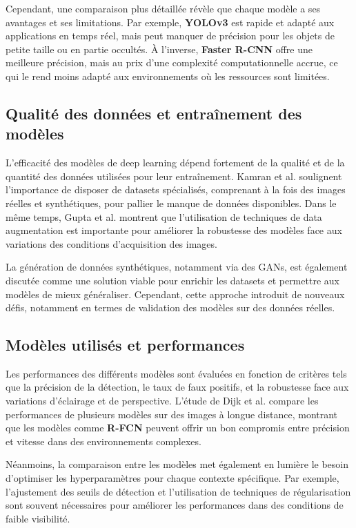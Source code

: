 Cependant, une comparaison plus détaillée révèle que chaque modèle a ses avantages et ses limitations. Par exemple, \textbf{YOLOv3} est rapide et adapté aux applications en temps réel, mais peut manquer de précision pour les objets de petite taille ou en partie occultés. À l'inverse, \textbf{Faster R-CNN} offre une meilleure précision, mais au prix d'une complexité computationnelle accrue, ce qui le rend moins adapté aux environnements où les ressources sont limitées.

\subsection{Qualité des données et entraînement des modèles}

L'efficacité des modèles de deep learning dépend fortement de la qualité et de la quantité des données utilisées pour leur entraînement. Kamran et al. \cite{kamran2020} soulignent l'importance de disposer de datasets spécialisés, comprenant à la fois des images réelles et synthétiques, pour pallier le manque de données disponibles. Dans le même temps, Gupta et al. \cite{gupta2021} montrent que l'utilisation de techniques de data augmentation est importante pour améliorer la robustesse des modèles face aux variations des conditions d'acquisition des images.

La génération de données synthétiques, notamment via des GANs, est également discutée comme une solution viable pour enrichir les datasets et permettre aux modèles de mieux généraliser. Cependant, cette approche introduit de nouveaux défis, notamment en termes de validation des modèles sur des données réelles.

\subsection{Modèles utilisés et performances}

Les performances des différents modèles sont évaluées en fonction de critères tels que la précision de la détection, le taux de faux positifs, et la robustesse face aux variations d'éclairage et de perspective. L'étude de Dijk et al. \cite{spie2020} compare les performances de plusieurs modèles sur des images à longue distance, montrant que les modèles comme \textbf{R-FCN} peuvent offrir un bon compromis entre précision et vitesse dans des environnements complexes.

Néanmoins, la comparaison entre les modèles met également en lumière le besoin d'optimiser les hyperparamètres pour chaque contexte spécifique. Par exemple, l'ajustement des seuils de détection et l'utilisation de techniques de régularisation sont souvent nécessaires pour améliorer les performances dans des conditions de faible visibilité.

